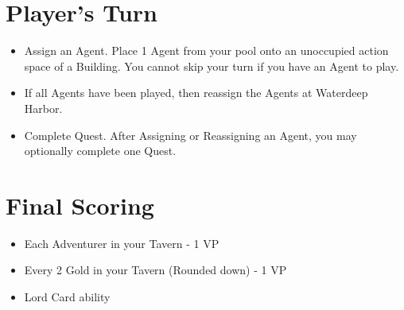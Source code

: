 \documentclass[12pt]{article}
\newenvironment{itemizeCustom}
{\begin{itemize}
  \setlength{\itemsep}{1pt}
  \setlength{\parskip}{0pt}
  \setlength{\parsep}{0pt}}
{\end{itemize}}
\begin{document}
\begin{mdframed}[style = customFrame]
\begin{multicols*}{2}
\section*{Player's Turn}
\begin{itemizeCustom}
	\item Assign an Agent. Place 1 Agent from your pool onto an unoccupied action space of a Building. You cannot skip your turn if you have an Agent to play.
	\item If all Agents have been played, then reassign the Agents at Waterdeep Harbor.
	\item Complete Quest. After Assigning or Reassigning an Agent, you may optionally complete one Quest.
\end{itemizeCustom}

\section*{Final Scoring}
\begin{itemizeCustom}
	\item Each Adventurer in your Tavern - 1 VP
	\item Every 2 Gold in your Tavern (Rounded down) - 1 VP
	\item Lord Card ability
\end{itemizeCustom}

\end{multicols*}
\end{mdframed}
\end{document}
